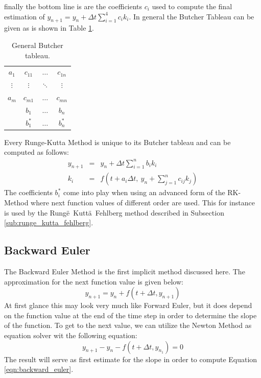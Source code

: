 \documentclass{aa}
\begin{document}
finally the bottom line is are the coefficients \(c_i\) used to compute the final estimation of
\(y_{n+1} = y_n + \Delta t \sum_{i=1}^{4} c_i k_i\).
In general the Butcher Tableau can be given as is shown in Table
\ref{tab:general_butcher_tableau}.
\begin{table}[htpb]
    \centering
    \captionsetup{width = 0.9 \linewidth}
    \caption{General Butcher tableau.}
    \label{tab:general_butcher_tableau}
    \begin{tabular}{c|ccc}
        \(a_1\)    & \(c_{11}\) & \(\dots\)  & \(c_{1n}\) \\
        \(\vdots\) & \(\vdots\) & \(\ddots\) & \(\vdots\) \\
        \(a_m\)    & \(c_{m1}\) & \(\dots\)  & \(c_{mn}\) \\ \hline
                   & \(b_1\)    & \(\dots\)  & \(b_n\)    \\
                   & \(b_1^*\)  & \(\dots\)  & \(b_n^*\)  
    \end{tabular}
\end{table}
Every Runge-Kutta Method is unique to its Butcher tableau and can be computed as follows:
\begin{eqnarray}
    \label{equ:general_rk_method_1}
    y_{n+1} & = & y_n + \Delta t \sum\limits_{i=1}^n b_i k_i\\ \label{equ:general_rk_method_2}
    k_i & = & f\left(t + a_i \Delta t,~ y_n + \sum\limits_{j=1}^n c_{ij}k_j\right)
\end{eqnarray}
The coefficients \(b_i^*\) come into play when using an advanced form of the RK-Method where
next function values of different order are used. This for instance is used by the
Runge\"~Kutta\"~Fehlberg method described in Subsection \ref{sub:runge_kutta_fehlberg}.

\subsection{Backward Euler}%
\label{sub:backward_euler}

The Backward Euler Method is the first implicit method discussed here. The approximation for
the next function value is given below:
\begin{equation}
    \label{eqn:backward_euler}
    y_{n+1} = y_n + f(t + \Delta t, y_{n+1})
\end{equation}
At first glance this may look very much like Forward Euler, but it does depend on the function
value at the end of the time step in order to determine the slope of the function. To get to
the next value, we can utilize the Newton Method as equation solver wit the following equation:
\begin{equation}
    \label{eqn:newton}
    y_{n+1} - y_n - f(t + \Delta t, y_{n_1}) = 0
\end{equation}
The result will serve as first estimate for the slope in order to compute Equation
\ref{eqn:backward_euler}.
\end{document}
